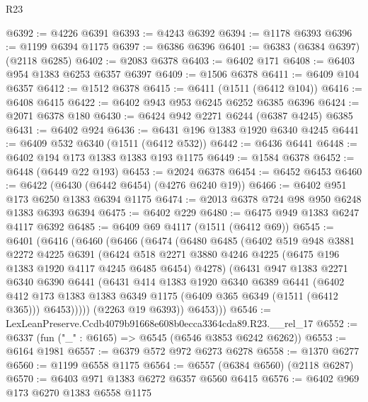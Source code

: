 \begin{lexlean}{R23}
\begin{coremodule}
@6392 := @4226 @6391
@6393 := @4243 @6392
@6394 := @1178 @6393
@6396 := @1199 @6394 @1175
@6397 := @6386 @6396
@6401 := @6383 (@6384 @6397) (@2118 @6285)
@6402 := @2083 @6378
@6403 := @6402 @171
@6408 := @6403 @954 @1383 @6253 @6357 @6397
@6409 := @1506 @6378
@6411 := @6409 @104 @6357
@6412 := @1512 @6378
@6415 := @6411 (@1511 (@6412 @104))
@6416 := @6408 @6415
@6422 := @6402 @943 @953 @6245 @6252 @6385 @6396
@6424 := @2071 @6378 @180
@6430 := @6424 @942 @2271 @6244 (@6387 @4245) @6385
@6431 := @6402 @924
@6436 := @6431 @196 @1383 @1920 @6340 @4245
@6441 := @6409 @532 @6340 (@1511 (@6412 @532))
@6442 := @6436 @6441
@6448 := @6402 @194 @173 @1383 @1383 @193 @1175
@6449 := @1584 @6378
@6452 := @6448 (@6449 @22 @193)
@6453 := @2024 @6378
@6454 := @6452 @6453
@6460 := @6422 (@6430 (@6442 @6454) (@4276 @6240 @19))
@6466 := @6402 @951 @173 @6250 @1383 @6394 @1175
@6474 := @2013 @6378 @724 @98 @950 @6248 @1383 @6393 @6394
@6475 := @6402 @229
@6480 := @6475 @949 @1383 @6247 @4117 @6392
@6485 := @6409 @69 @4117 (@1511 (@6412 @69))
@6545 := @6401
    (@6416
      (@6460
        (@6466
          (@6474
            (@6480
              @6485
              (@6402
                @519
                @948
                @3881
                @2272
                @4225
                @6391
                (@6424
                  @518
                  @2271
                  @3880
                  @4246
                  @4225
                  (@6475 @196 @1383 @1920 @4117 @4245 @6485 @6454)
                  @4278)
                (@6431
                  @947
                  @1383
                  @2271
                  @6340
                  @6390
                  @6441
                  (@6431
                    @414
                    @1383
                    @1920
                    @6340
                    @6389
                    @6441
                    (@6402
                      @412
                      @173
                      @1383
                      @1383
                      @6349
                      @1175
                      (@6409 @365 @6349 (@1511 (@6412 @365)))
                      @6453)))))
            (@2263 @19 @6393))
          @6453)))
@6546 := LexLeanPreserve.Ccdb4079b91668e608b0ecca3364cda89.R23.__rel_17
@6552 := @6337 (fun ("_" : @6165) => @6545 (@6546 @3853 @6242 @6262))
@6553 := @6164 @1981
@6557 := @6379 @572 @972 @6273 @6278
@6558 := @1370 @6277
@6560 := @1199 @6558 @1175
@6564 := @6557 (@6384 @6560) (@2118 @6287)
@6570 := @6403 @971 @1383 @6272 @6357 @6560 @6415
@6576 := @6402 @969 @173 @6270 @1383 @6558 @1175

\end{coremodule}
\end{lexlean}
